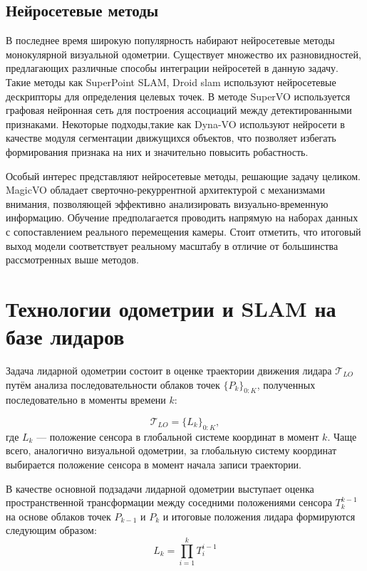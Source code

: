 \subsection{Нейросетевые методы}
В последнее время широкую популярность набирают нейросетевые методы монокулярной
визуальной одометрии. Существует множество их разновидностей, предлагающих различные
способы интеграции нейросетей в данную задачу. Такие методы как SuperPoint SLAM, Droid slam
используют нейросетевые дескрипторы для определения целевых точек. В методе SuperVO используется
графовая нейронная сеть для построения ассоциаций между детектированными признаками. 
Некоторые подходы,такие как Dyna-VO используют нейросети в качестве модуля сегментации
движущихся объектов, что позволяет избегать формирования признака на них и значительно 
повысить робастность.

Особый интерес представляют нейросетевые методы, решающие задачу целиком. MagicVO обладает
сверточно-рекуррентной архитектурой с механизмами внимания, позволяющей эффективно 
анализировать визуально-временную информацию. Обучение предполагается проводить напрямую
на наборах данных с сопоставлением реального перемещения камеры. Стоит отметить, что
итоговый выход модели соответствует реальному масштабу в отличие от большинства рассмотренных
выше методов. 

\section{Технологии одометрии и SLAM на базе лидаров}

Задача лидарной одометрии состоит в оценке траектории движения лидара 
$\mathcal{T}_{LO}$ путём анализа последовательности облаков точек 
$\{{P}_k\}_{0:K}$, полученных последовательно в моменты времени $k$:

\begin{equation}
    \mathcal{T}_{LO} = \{ L_k \}_{0:K},
\end{equation}
где $L_k$ --- положение сенсора в глобальной системе координат в момент $k$. Чаще 
всего, аналогично визуальной одометрии, за глобальную систему координат выбирается положение сенсора в 
момент начала записи траектории.

В качестве основной подзадачи лидарной одометрии выступает оценка пространственной 
трансформации между соседними положениями сенсора $T_k^{k-1}$ на основе облаков 
точек ${P}_{k-1}$ и ${P}_k$ и итоговые положения лидара формируются
следующим образом:
\begin{equation}
    L_k = \prod_{i=1}^{k} T_i^{i-1}
\end{equation}

